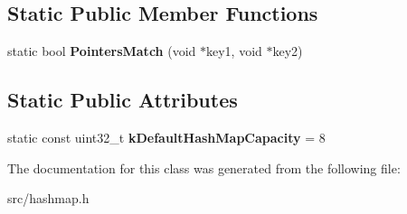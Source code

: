 \subsection*{Static Public Member Functions}
\begin{DoxyCompactItemize}
\item 
\hypertarget{classv8_1_1internal_1_1_template_hash_map_impl_acbf79c508addc62c4b0b0056bb440bd4}{}static bool {\bfseries Pointers\+Match} (void $\ast$key1, void $\ast$key2)\label{classv8_1_1internal_1_1_template_hash_map_impl_acbf79c508addc62c4b0b0056bb440bd4}

\end{DoxyCompactItemize}
\subsection*{Static Public Attributes}
\begin{DoxyCompactItemize}
\item 
\hypertarget{classv8_1_1internal_1_1_template_hash_map_impl_a528fed70c08ca09b3ff3177ae573a575}{}static const uint32\+\_\+t {\bfseries k\+Default\+Hash\+Map\+Capacity} = 8\label{classv8_1_1internal_1_1_template_hash_map_impl_a528fed70c08ca09b3ff3177ae573a575}

\end{DoxyCompactItemize}


The documentation for this class was generated from the following file\+:\begin{DoxyCompactItemize}
\item 
src/hashmap.\+h\end{DoxyCompactItemize}
